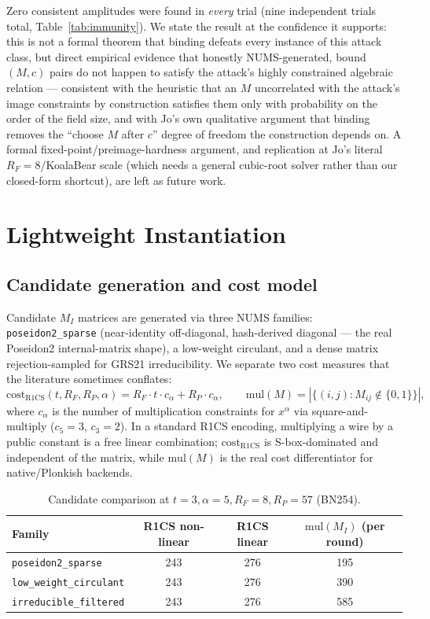 \documentclass[11pt]{article}
\newcommand{\MI}{M_{I}}
\begin{document}
Zero consistent amplitudes were found in \emph{every} trial (nine
independent trials total, Table~\ref{tab:immunity}). We state the result
at the confidence it supports: this is not a formal theorem that binding
defeats every instance of this attack class, but direct empirical evidence
that honestly NUMS-generated, bound $(M,c)$ pairs do not happen to satisfy
the attack's highly constrained algebraic relation --- consistent with the
heuristic that an $M$ uncorrelated with the attack's image constraints by
construction satisfies them only with probability on the order of the
field size, and with Jo's own qualitative argument that binding removes
the ``choose $M$ after $c$'' degree of freedom the construction depends
on. A formal fixed-point/preimage-hardness argument, and replication at
Jo's literal $R_F=8$/KoalaBear scale (which needs a general cubic-root
solver rather than our closed-form shortcut), are left as future work.

\section{Lightweight Instantiation}
\label{sec:lightweight}

\subsection{Candidate generation and cost model}

Candidate $\MI$ matrices are generated via three NUMS families:
\texttt{poseidon2\_sparse} (near-identity off-diagonal, hash-derived
diagonal --- the real Poseidon2 internal-matrix shape), a low-weight
circulant, and a dense matrix rejection-sampled for GRS21 irreducibility.
We separate two cost measures that the literature sometimes conflates:
\[
  \mathrm{cost}_{\mathrm{R1CS}}(t,R_F,R_P,\alpha) = R_F\cdot t \cdot
  c_\alpha + R_P \cdot c_\alpha,
  \qquad
  \mathrm{mul}(M) = |\{(i,j): M_{ij}\notin\{0,1\}\}|,
\]
where $c_\alpha$ is the number of multiplication constraints for
$x^{\alpha}$ via square-and-multiply ($c_5=3$, $c_3=2$). In a standard
R1CS encoding, multiplying a wire by a public constant is a free linear
combination; $\mathrm{cost}_{\mathrm{R1CS}}$ is S-box-dominated and
independent of the matrix, while $\mathrm{mul}(M)$ is the real cost
differentiator for native/Plonkish backends.

\begin{table}[h!]
\centering
\caption{Candidate comparison at $t=3,\alpha=5,R_F=8,R_P=57$ (BN254).}
\label{tab:candidates}
\begin{tabular}{@{}lccc@{}}
\toprule
Family & R1CS non-linear & R1CS linear & $\mathrm{mul}(\MI)$ (per round) \\
\midrule
\texttt{poseidon2\_sparse} & 243 & 276 & 195 \\
\texttt{low\_weight\_circulant} & 243 & 276 & 390 \\
\texttt{irreducible\_filtered} & 243 & 276 & 585 \\
\bottomrule
\end{tabular}
\end{table}
\end{document}
